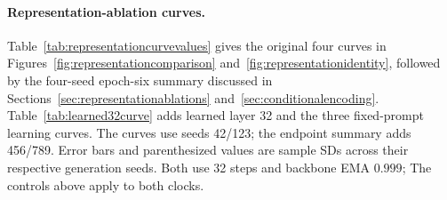 \documentclass{article}
\newcommand{\rev}[1]{{\color{blue}#1}}
\begin{document}
\paragraph{Representation-ablation curves.}
\rev{Table~\ref{tab:representationcurvevalues} gives the original four curves in Figures~\ref{fig:representationcomparison} and~\ref{fig:representationidentity},} followed by the four-seed epoch-six summary discussed in Sections~\ref{sec:representationablations} and~\ref{sec:conditionalencoding}. \rev{Table~\ref{tab:learned32curve} adds learned layer 32 and the three fixed-prompt learning curves.} The curves use seeds 42/123; the endpoint summary adds 456/789. Error bars and parenthesized values are sample SDs across their respective generation seeds. Both use 32 steps and backbone EMA $0.999$; The controls above apply to both clocks.
\end{document}
